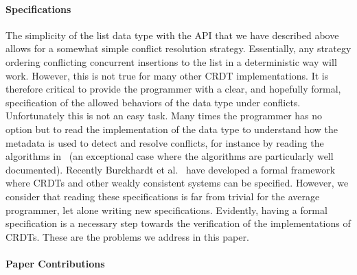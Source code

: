 \paragraph{Specifications}
The simplicity of the list data type with the API that we have
described above allows for a somewhat simple conflict resolution
strategy.
%
Essentially, any strategy ordering conflicting concurrent insertions
to the list in a deterministic way will work.
%
However, this is not true for many other CRDT implementations.
%
It is therefore critical to provide the programmer with a clear, and
hopefully formal, specification of the allowed behaviors of the data
type under conflicts.
%
Unfortunately this is not an easy task.
%
Many times the programmer has no option but to read the implementation
of the data type to understand how the metadata is used to detect and
resolve conflicts, for instance by reading the algorithms
in~\cite{ShapiroPBZ11} (an exceptional case where the algorithms are
particularly well documented).
%
Recently Burckhardt et al.~\cite{BurckhardtGYZ14, Burckhardt14} have
developed a formal framework where CRDTs and other weakly
consistent systems can be specified.
%
However, we consider that reading these specifications is far from
trivial for the average programmer, let alone writing new
specifications.
%
Evidently, having a formal specification is a necessary step towards
the verification of the implementations of CRDTs.
%
These are the problems we address in this paper.

\paragraph{Paper Contributions}

